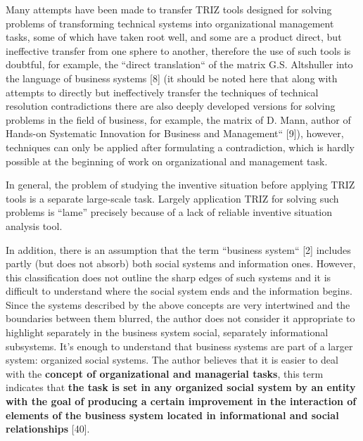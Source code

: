 Many attempts have been made to transfer TRIZ tools designed for solving
problems of transforming technical systems into organizational management
tasks, some of which have taken root well, and some are a product direct, but
ineffective transfer from one sphere to another, therefore the use of such
tools is doubtful, for example, the “direct translation“ of the matrix
G.S. Altshuller into the language of business systems [8] (it should be noted
here that along with attempts to directly but ineffectively transfer the
techniques of technical resolution contradictions there are also deeply
developed versions for solving problems in the field of business, for example,
the matrix of D. Mann, author of Hands-on Systematic Innovation for Business
and Management“ [9]), however, techniques can only be applied after
formulating a contradiction, which is hardly possible at the beginning of work
on organizational and management task.

In general, the problem of studying the inventive situation before applying
TRIZ tools is a separate large-scale task. Largely application TRIZ for
solving such problems is “lame” precisely because of a lack of reliable
inventive situation analysis tool.

In addition, there is an assumption that the term “business system“ [2]
includes partly (but does not absorb) both social systems and information
ones.  However, this classification does not outline the sharp edges of such
systems and it is difficult to understand where the social system ends and the
information begins. Since the systems described by the above concepts are very
intertwined and the boundaries between them blurred, the author does not
consider it appropriate to highlight separately in the business system social,
separately informational subsystems. It’s enough to understand that business
systems are part of a larger system: organized social systems.  The author
believes that it is easier to deal with the \textbf{concept of organizational
  and managerial tasks}, this term indicates that \textbf{the task is set in
  any organized social system by an entity with the goal of producing a
  certain improvement in the interaction of elements of the business system
  located in informational and social relationships} [40].


